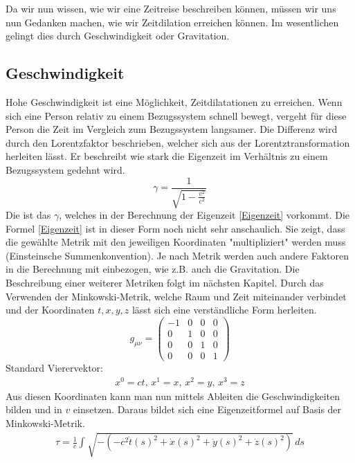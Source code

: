\begin{refsection}
Da wir nun wissen, wie wir eine Zeitreise beschreiben können, müssen wir uns nun Gedanken machen, wie wir Zeitdilation erreichen können. Im wesentlichen gelingt dies durch Geschwindigkeit oder Gravitation. 
\subsection{Geschwindigkeit}
Hohe Geschwindigkeit ist eine Möglichkeit, Zeitdilatationen zu erreichen. Wenn sich eine Person relativ zu einem Bezugssystem schnell bewegt, vergeht f\"ur diese Person die Zeit im Vergleich zum Bezugssystem langsamer. Die Differenz wird durch den Lorentzfaktor beschrieben, welcher sich aus der Lorentztransformation herleiten l\"asst. Er beschreibt wie stark die Eigenzeit im Verhältnis zu einem Bezugssystem gedehnt wird. %
\begin{equation} \label{lorentzfaktor}
    \gamma=\frac{1}{\sqrt{1-\displaystyle\frac{v^2}{c^2}}} 
\end{equation}
Die ist das $\gamma$, welches in der Berechnung der Eigenzeit \eqref{Eigenzeit} vorkommt. %
Die Formel \eqref{Eigenzeit} ist in dieser Form noch nicht sehr anschaulich. Sie zeigt, dass die gewählte Metrik mit den jeweiligen Koordinaten "multipliziert" werden muss (Einsteinsche Summenkonvention). Je nach Metrik werden auch andere Faktoren in die Berechnung mit einbezogen, wie z.B. auch die Gravitation. Die Beschreibung einer weiterer Metriken folgt im nächsten Kapitel.
Durch das Verwenden der Minkowski-Metrik, welche Raum und Zeit miteinander verbindet und der Koordinaten $t, x, y, z$ l\"asst sich eine verst\"andliche Form herleiten. 
\begin{equation}
    g_{\mu\nu}=
    \begin{pmatrix}
        -1 & 0 & 0 & 0 \\
        0 & 1 & 0 & 0 \\
        0 & 0 & 1 & 0 \\
        0 & 0 & 0 & 1
    \end{pmatrix}
\end{equation}
Standard Vierervektor:
\begin{align*}
x^{0}=ct,\, x^{1}=x,\, x^{2}=y,\, x^{3}=z 
\end{align*}
Aus diesen Koordinaten kann man nun mittels Ableiten die Geschwindigkeiten bilden und in $v$ einsetzen.
Daraus bildet sich eine Eigenzeitformel auf Basis der Minkowski-Metrik.
\begin{align*}
    \tau
    =
    \frac{1}{c}\int_{}^{}\sqrt{-(-c^2\dot{t}(s)^{2}+\dot{x}(s)^{2}+\dot{y}(s)^{2}+\dot{z}(s)^{2})}\,ds

\end{align*}
\end{refsection}
